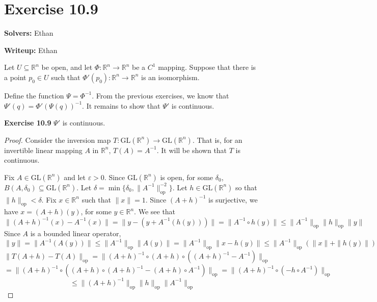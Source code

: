 \documentclass{article}
\newcommand{\op}{\mathrm{op}}
\newcommand{\GL}{\mathrm{GL}}
\theoremstyle{plain} %
\numberwithin{thm}{section} %
\theoremstyle{definition}
\begin{document}
    \section*{Exercise 10.9}
    \textbf{Solvers:} Ethan

    \noindent\textbf{Writeup:} Ethan

    Let \(U \subseteq \mathbb{R}^n\) be open, and let \(\Phi : \mathbb{R}^n \to \mathbb{R}^n\) be a \(C^1\) mapping. Suppose that there is a point \(p_0 \in U\) such that \(\Phi '(p_0) : \mathbb{R}^n \to \mathbb{R}^n\) is an isomorphism.

    \medskip

    Define the function \(\Psi = \Phi ^{-1}\). From the previous exercises, we know that \(\Psi '(q) = \Phi '(\Psi (q)) ^{-1}\). It remains to show that \(\Psi '\) is continuous.

    \noindent\textbf{Exercise 10.9} \(\Psi '\) is continuous.

    \begin{proof}
        Consider the inversion map \(T : \GL(\mathbb{R}^n) \to \GL(\mathbb{R}^n)\). That is, for an invertible linear mapping \(A\) in \(\mathbb{R}^n\), \(T(A) = A^{-1}\). It will be shown that \(T\) is continuous.

        Fix \(A \in \GL(\mathbb{R}^n)\) and let \(\varepsilon > 0\). Since \(\GL(\mathbb{R}^n)\) is open, for some \(\delta _0\), \(B(A, \delta _0) \subseteq \GL(\mathbb{R}^n)\). Let \(\delta = \min \{\delta _0, \|A^{-1}\| _{\op}^{-2}\}\). Let \(h \in \GL(\mathbb{R}^n)\) so that \(\|h\| _{\op} < \delta\). Fix \(x \in \mathbb{R}^n\) such that \(\|x\| = 1\). Since \((A + h)^{-1}\) is surjective, we have \(x = (A+h) (y)\), for some \(y \in \mathbb{R}^n\). We see that
        \[
            \|(A + h)^{-1} (x) - A^{-1} (x)\| = \|y - (y + A^{-1}(h(y)))\| = \|A^{-1} \circ h (y)\| \leq \|A^{-1}\| _{\op} \|h\| _{\op} \|y\|
        \]
        Since \(A\) is a bounded linear operator,
        \[
            \|y\| = \|A^{-1}(A (y))\| \leq \|A^{-1}\| _{\op} \|A(y)\| = \|A^{-1}\| _{\op} \|x - h(y)\| \leq \|A^{-1}\| _{\op} \left( \|x\| + \|h(y)\| \right)
        \]
        \[
            \|T(A + h) - T(A)\|_{\op} = \|(A+h)^{-1} \circ (A+h) \circ ((A+h)^{-1} - A^{-1})\|_{\op}
        \]
        \[
            = \|(A+h)^{-1} \circ ((A+h)\circ (A+h)^{-1} - (A+h) \circ A^{-1})\|_{\op} = \|(A+h)^{-1} \circ (- h \circ A^{-1})\|_{\op}
        \]
        \[
            \leq \|(A+h)^{-1}\|_{\op} \|h\|_{\op} \|A^{-1}\|_{\op}
        \]
    \end{proof}
\end{document}
